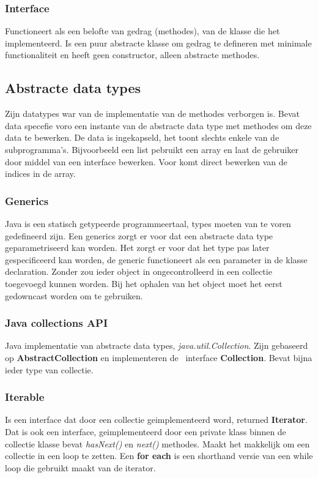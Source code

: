 \subsubsection{Interface}
Functioneert als een belofte van gedrag (methodes), van de klasse die het implementeerd.
Is een puur abstracte klasse om gedrag te defineren met minimale functionaliteit en heeft geen constructor, alleen abstracte methodes.

\subsection{Abstracte data types}
Zijn datatypes war van de implementatie van de methodes verborgen is.
Bevat data specefie voro een instante van de abstracte data type met methodes om deze data te bewerken.
De data is ingekapseld, het toont slechts enkele van de subprogramma's.
Bijvoorbeeld een list pebruikt een array en laat de gebruiker door middel van een interface bewerken.
Voor komt direct bewerken van de indices in de array.

\subsubsection{Generics}
Java is een statisch getypeerde programmeertaal, types moeten van te voren gedefineerd zijn.
Een generics zorgt er voor dat een abstracte data type geparametriseerd kan worden.
Het zorgt er voor dat het type pas later gespecificeerd kan worden, de generic functioneert als een parameter in de klasse declaration.
Zonder zou ieder object in ongecontrolleerd in een collectie toegevoegd kunnen worden.
Bij het ophalen van het object moet het eerst gedowncast worden om te gebruiken.

\subsubsection{Java collections API}
Java implementatie van abstracte data types, \textit{java.util.Collection}.
Zijn gebaseerd op \textbf{AbstractCollection} en implementeren de \ interface \textbf{Collection}.
Bevat bijna ieder type van collectie.

\subsubsection{Iterable}
Is een interface dat door een collectie geimplementeerd word, returned \textbf{Iterator}.
Dat is ook een interface, geimplementeerd door een private klass binnen de collectie klasse bevat \textit{hasNext()} en \textit{next()} methodes.
Maakt het makkelijk om een collectie in een loop te zetten.
Een \textbf{for each} is een shorthand versie van een while loop die gebruikt maakt van de iterator.

